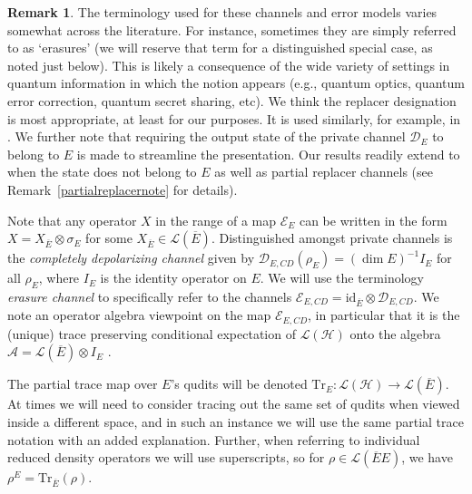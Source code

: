 \documentclass[11pt]{amsart}
\theoremstyle{definition}
\theoremstyle{definition}
\theoremstyle{definition}
\newtheorem{remark}[thm]{Remark}
\newcommand{\tr}{\textrm{Tr}}
\newcommand{\1}{\mathbb{I}}
\begin{document}
\begin{remark}
The terminology used for these channels and error models varies somewhat across the literature. For instance, sometimes they are simply referred to as `erasures' (we will reserve that term for a distinguished special case, as noted just below). This is likely a consequence of the wide variety of settings in quantum information in which the notion appears (e.g., quantum optics, quantum error correction, quantum secret sharing, etc). We think the replacer designation is most appropriate, at least for our purposes. It is used similarly, for example, in \cite{cooney2016strong}. We further note that requiring the output state of the private channel $\mathcal D_E$ to belong to $E$ is made to streamline the presentation. Our results readily extend to when the state does not belong to $E$ as well as partial replacer channels (see Remark~\ref{partialreplacernote} for details). 

Note that any operator $X$ in the range of a map $\mathcal E_E$ can be written in the form $X = X_{\overline{E}} \otimes \sigma_E$ for some $X_{\overline{E}} \in \mathcal L({\overline{E}})$. 
Distinguished amongst private channels is the {\it completely depolarizing channel} given by  $\mathcal D_{E,CD}(\rho_E) = (\dim E)^{-1} I_E$ for all $\rho_E$, where $I_E$ is the identity operator on $E$.
We will use the terminology {\it erasure channel} to specifically refer to the channels $\mathcal E_{E,CD}= \mathrm{id}_{\overline{E}} \otimes \mathcal D_{E,CD}$. 
We note an operator algebra viewpoint on the map $\mathcal E_{E,CD}$, in particular that it is the (unique) trace preserving conditional expectation of $\mathcal L(\mathcal H)$ onto the algebra $\mathcal A = \mathcal L(\overline{E})\otimes I_E$ \cite{paulsen2002completely,pereira2006representing,church2012private}. 
\end{remark} 

The partial trace map over $E$'s qudits will be denoted $\tr_E : \mathcal L(\mathcal H) \rightarrow \mathcal L(\overline{E})$. 
At times we will need to consider tracing out the same set of qudits when viewed inside a different space, and in such an instance we will use the same partial trace notation with an added explanation. 
Further, when referring to individual reduced density operators we will use superscripts, so for $\rho\in\mathcal L(\overline{E}E)$, we have $\rho^{E} = \tr_{\overline{E}}(\rho)$.  
\end{document}
